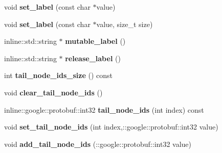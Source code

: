 \begin{DoxyCompactItemize}
\item 
\hypertarget{classHypergraph__Edge_abd03f3020632e7d2fedae16116853e55}{
void {\bfseries set\_\-label} (const char $\ast$value)}
\label{classHypergraph__Edge_abd03f3020632e7d2fedae16116853e55}

\item 
\hypertarget{classHypergraph__Edge_adb4ad80e1805c7355ad9aad07bdddff7}{
void {\bfseries set\_\-label} (const char $\ast$value, size\_\-t size)}
\label{classHypergraph__Edge_adb4ad80e1805c7355ad9aad07bdddff7}

\item 
\hypertarget{classHypergraph__Edge_a2906f358190374e1fe8c2eef1bfe99a0}{
inline::std::string $\ast$ {\bfseries mutable\_\-label} ()}
\label{classHypergraph__Edge_a2906f358190374e1fe8c2eef1bfe99a0}

\item 
\hypertarget{classHypergraph__Edge_a9fc2fad1c4d62a579bf3b149fe4312d4}{
inline::std::string $\ast$ {\bfseries release\_\-label} ()}
\label{classHypergraph__Edge_a9fc2fad1c4d62a579bf3b149fe4312d4}

\item 
\hypertarget{classHypergraph__Edge_ab4a326ca4b060c3a3b96356875615274}{
int {\bfseries tail\_\-node\_\-ids\_\-size} () const }
\label{classHypergraph__Edge_ab4a326ca4b060c3a3b96356875615274}

\item 
\hypertarget{classHypergraph__Edge_a7bca4b7aa0ddb3c3db383cf4f9ae4010}{
void {\bfseries clear\_\-tail\_\-node\_\-ids} ()}
\label{classHypergraph__Edge_a7bca4b7aa0ddb3c3db383cf4f9ae4010}

\item 
\hypertarget{classHypergraph__Edge_a89405905c2031e169625ffcd7f61d46f}{
inline::google::protobuf::int32 {\bfseries tail\_\-node\_\-ids} (int index) const }
\label{classHypergraph__Edge_a89405905c2031e169625ffcd7f61d46f}

\item 
\hypertarget{classHypergraph__Edge_aff9ace3fb27f13d171ae18139cd01784}{
void {\bfseries set\_\-tail\_\-node\_\-ids} (int index,::google::protobuf::int32 value)}
\label{classHypergraph__Edge_aff9ace3fb27f13d171ae18139cd01784}

\item 
\hypertarget{classHypergraph__Edge_ad94f1a04bf6815d17ca4121ff6770bee}{
void {\bfseries add\_\-tail\_\-node\_\-ids} (::google::protobuf::int32 value)}
\label{classHypergraph__Edge_ad94f1a04bf6815d17ca4121ff6770bee}


\end{DoxyCompactItemize}
